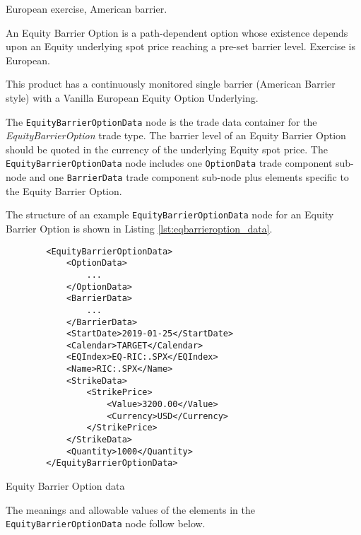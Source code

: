 \else

European exercise, American barrier.

An Equity Barrier Option is a path-dependent option whose existence depends upon an Equity underlying
spot price reaching a pre-set barrier level. Exercise is European.

This product has a continuously monitored single barrier (American Barrier style) with a Vanilla
European Equity Option Underlying.

\fi

The \lstinline!EquityBarrierOptionData!  node is the trade data container for the \emph{EquityBarrierOption} trade type. The barrier level of an Equity Barrier Option should be quoted in the currency of 
the underlying Equity spot price. The \lstinline!EquityBarrierOptionData!  node includes one  \lstinline!OptionData! trade component sub-node and one \lstinline!BarrierData! trade component sub-node plus elements
specific to the Equity Barrier Option. 

The structure of an example \lstinline!EquityBarrierOptionData! node for an Equity Barrier Option is shown in Listing
\ref{lst:eqbarrieroption_data}.

\begin{listing}[H]
\begin{verbatim}
        <EquityBarrierOptionData>
            <OptionData>
                ...
            </OptionData>
            <BarrierData>
                ...
            </BarrierData>
            <StartDate>2019-01-25</StartDate>
            <Calendar>TARGET</Calendar>
            <EQIndex>EQ-RIC:.SPX</EQIndex>            
            <Name>RIC:.SPX</Name>
            <StrikeData>
				<StrikePrice>
					<Value>3200.00</Value>
					<Currency>USD</Currency>
				</StrikePrice>
            </StrikeData>
            <Quantity>1000</Quantity>
        </EquityBarrierOptionData>
\end{verbatim}
\caption{Equity Barrier Option data}
\label{lst:eqbarrieroption_data}
\end{listing}

The meanings and allowable values of the elements in the \lstinline!EquityBarrierOptionData!  node follow below.

